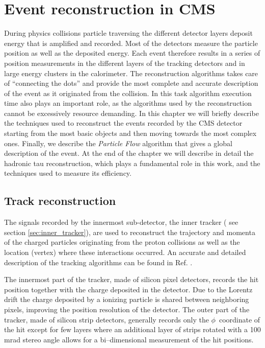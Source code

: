 \chapter{Event reconstruction in CMS}

During physics collisions particle traversing the different detector layers deposit energy that is amplified and recorded. Most of the detectors measure the particle position as well as the deposited energy. Each event therefore results in a series of position measurements in the different layers of the tracking detectors and in large energy clusters in the calorimeter. The reconstruction algorithms takes care of ``connecting the dots'' and provide the most complete and accurate description of the event as it originated from the collision. In this task algorithm execution time also plays an important role, as the algorithms used by the reconstruction cannot be excessively resource demanding. In this chapter we will briefly describe the techniques used to reconstruct the events recorded by the CMS detector starting from the most basic objects and then moving towards the most complex ones. Finally, we describe the \emph{Particle Flow} algorithm that gives a global description of the event. At the end of the chapter we will describe in detail the hadronic tau reconstruction, which plays a fundamental role in this work, and the techniques used to measure its efficiency.

\section{Track reconstruction}

The signals recorded by the innermost sub-detector, the inner tracker ( see section \ref{sec:inner_tracker}), are used to reconstruct the trajectory and momenta of the charged particles originating from the proton collisions as well as the location (vertex) where these interactions occurred. An accurate and detailed description of the tracking algorithms can be found in Ref. \cite{cms_trk_11_01}.

The innermost part of the tracker, made of silicon pixel detectors, records the hit position together with the charge deposited in the detector. Due to the Lorentz drift the charge deposited by a ionizing particle is shared between neighboring pixels, improving the position resolution of the detector. The outer part of the tracker, made of silicon strip detectors, generally records only the $\phi$\ coordinate of the hit except for few layers where an additional layer of strips rotated with a 100 mrad stereo angle allows for a bi--dimensional measurement of the hit positions.

